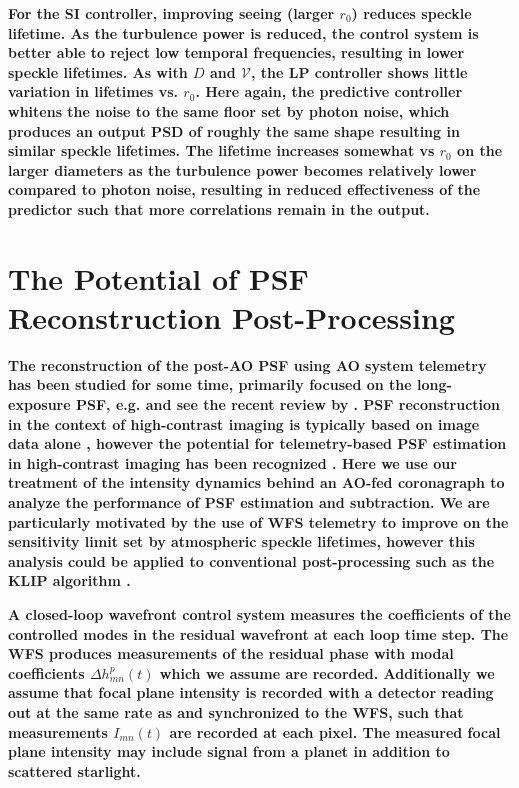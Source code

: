\documentclass[10pt,preprint]{aastex631}
\begin{document}
\textbf{For the SI controller, improving seeing (larger $r_0$) reduces speckle lifetime.  As the turbulence power is reduced, the control system is better able to reject low temporal frequencies, resulting in lower speckle lifetimes.  As with $D$ and $\mathcal{V}$, the LP controller shows little variation in lifetimes vs. $r_0$.  Here again, the predictive controller whitens the noise to the same floor set by photon noise, which produces an output PSD of roughly the same shape resulting in similar speckle lifetimes.  The lifetime increases somewhat vs $r_0$ on the larger diameters as the turbulence power becomes relatively lower compared to photon noise, resulting in reduced effectiveness of the predictor such that more correlations remain in the output. }


\section{The Potential of \textbf{PSF} Reconstruction Post-Processing}
\label{sec:reconstruction}
\textbf{The reconstruction of the post-AO PSF using AO system telemetry has been studied for some time, primarily focused on the long-exposure PSF, e.g. \citet{1997JOSAA..14.3057V} and see the recent review by \citep{2020SPIE11448E..0AB}.  PSF reconstruction in the context of high-contrast imaging is typically based on image data alone \citep{2006ApJ...641..556M,2007ApJ...660..770L,2012ApJ...755L..28S}, however the potential for telemetry-based PSF estimation in high-contrast imaging has been recognized \citep{2013ApJ...767...21F,2013ApJ...767..100C}. Here we use our treatment of the intensity dynamics behind an AO-fed coronagraph to analyze the performance of PSF estimation and subtraction.  We are particularly motivated by the use of WFS telemetry to improve on the sensitivity limit set by atmospheric speckle lifetimes, however this analysis could be applied to conventional post-processing such as the KLIP algorithm \citep{2012ApJ...755L..28S}.}

\textbf{A closed-loop wavefront control system measures the coefficients of the controlled modes in the residual wavefront at each loop time step.  The WFS produces measurements of the residual phase with modal coefficients $\Delta h_{mn}^{p}(t)$ which we assume are recorded. Additionally we assume that focal plane intensity is recorded with a detector reading out at the same rate as and synchronized to the WFS, such that measurements $I_{mn}(t)$ are recorded at each pixel. The measured focal plane intensity may include signal from a planet in addition to scattered starlight.}
\end{document}
